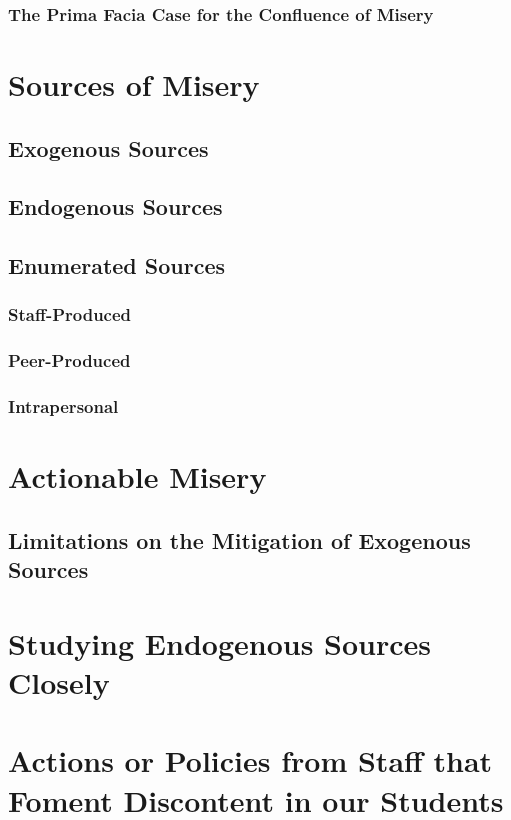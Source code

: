 \documentclass[UTF8]{article}
\begin{document}
	\subsubsection{The Prima Facia Case for the Confluence of Misery}

	\section{Sources of Misery}
	\subsection{Exogenous Sources}
	\subsection{Endogenous Sources}
	\subsection{Enumerated Sources}
	\subsubsection{Staff-Produced}
	\subsubsection{Peer-Produced}
	\subsubsection{Intrapersonal}

	\section{Actionable Misery}
	\subsection{Limitations on the Mitigation of Exogenous Sources}

	\section{Studying Endogenous Sources Closely}
	
	\section{Actions or Policies from Staff that Foment Discontent in our Students}
	
\end{document}
